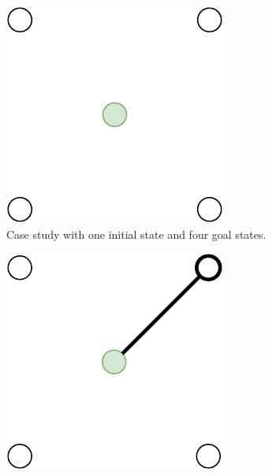 \begin{figure}[ht!]
  \centering
  \begin{subfigure}[t]{0.25\linewidth}
    \centering\includegraphics[width=.85\linewidth]{chapter_5_mapping/imgs/mg_all.pdf}
    \caption{\label{fig:ch5_mg_tsp_1} Case study with one initial state and four goal states.}
  \end{subfigure}
  \hfill
  \begin{subfigure}[t]{0.25\linewidth}
    \centering\includegraphics[width=.85\linewidth]{chapter_5_mapping/imgs/mg_sg_2.pdf}

\end{subfigure}
\end{figure}
